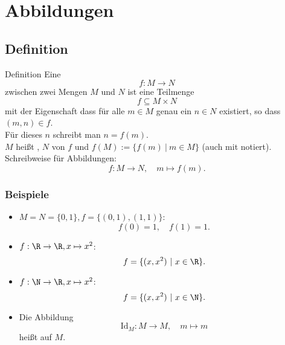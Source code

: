 \section{Abbildungen}
%
\subsection{Definition}
%
%
\begin{frame}
	
	\begin{block}{Definition}
		Eine  
		$$
			f:M\to N
		$$ 
		zwischen zwei Mengen $M$ und $N$ ist eine Teilmenge 
		$$
			f \subseteq M\times N
		$$ 
		mit der Eigenschaft dass für alle $m\in M$ genau ein $n\in N$ existiert, so dass $(m,n)\in f$.\\
		Für dieses $n$ schreibt man $n = f(m)$.\\[2mm]
		
		\pause
		$M$ hei{\ss}t , $N$  von $f$ und 
		$f(M) := \{ f(m)~|~  m\in M \}$  (auch mit  notiert).\\[2mm]
		
		\pause
		Schreibweise für Abbildungen:
		\vspace{-2mm}
		$$ 
			f: M\to N, \quad m\mapsto f(m).
		$$
	\end{block}
	
\end{frame}
%
%
\begin{frame}\frametitle{Beispiele}

	\begin{itemize}
		\item $M=N=\{0,1\}, f = \{(0,1),(1,1)\}$:
			$$
				f(0) = 1,\quad f(1)=1.
			$$ \pause
		\item $f: \R\to \R, x\mapsto x^2$: \pause
			$$
				f = \{(x,x^2)~|~ x\in \R\}.
			$$\pause
		\item $f: \N\to \R, x\mapsto x^2$: \pause
			$$
				f = \{(x,x^2)~|~ x\in \N\}.
			$$\pause
		\item Die Abbildung 
			$$
				\text{Id}_M: M\to M, \quad m\mapsto m
			$$
			hei{\ss}t  auf $M$.
	\end{itemize}

\end{frame}
%
%
